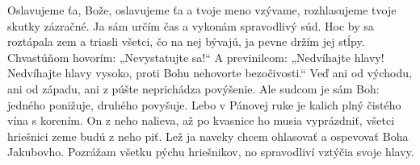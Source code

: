 Oslavujeme ťa, Bože,
oslavujeme ťa a tvoje meno vzývame,
\versseparator
rozhlasujeme tvoje skutky zázračné.
Ja sám určím čas
a vykonám spravodlivý súd.
\versseparator
Hoc by sa roztápala zem a triasli všetci, čo na nej bývajú,
ja pevne držím jej stĺpy.
\versseparator
Chvastúňom hovorím: „Nevystatujte sa!“
A previnilcom: „Nedvíhajte hlavy!
\versseparator
Nedvíhajte hlavy vysoko,
proti Bohu nehovorte bezočivosti.“
\versseparator
Veď ani od východu, ani od západu,
ani z púšte neprichádza povýšenie.
Ale sudcom je sám Boh:
\versseparator
jedného ponižuje, druhého povyšuje.
Lebo v Pánovej ruke je kalich
plný čistého vína s korením.
\versseparator
On z neho nalieva,
až po kvasnice ho musia vyprázdniť,
všetci hriešnici zeme budú z neho piť.
\versseparator
Lež ja naveky chcem ohlasovať
a ospevovať Boha Jakubovho.
\versseparator
Pozrážam všetku pýchu hriešnikov,
no spravodliví vztýčia svoje hlavy.